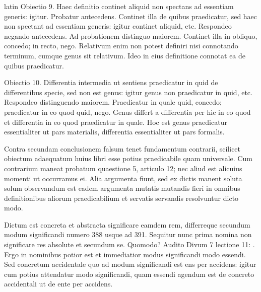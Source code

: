 \begin{otherlanguage*}{latin}
\pstart
Obiectio 9. Haec definitio continet aliquid non spectans ad essentiam generis:
igitur. Probatur antecedens. Continet illa de quibus praedicatur, sed haec non spectant ad essentiam generis:
igitur continet aliquid, etc. Respondeo negando antecedens. Ad probationem distinguo maiorem. Continet illa in obliquo, concedo; in recto, nego. Relativum enim non potest definiri nisi connotando terminum, cumque genus sit relativum. Ideo in eius definitione connotat ea de quibus praedicatur. 
\pend

\pstart
Obiectio 10. Differentia intermedia ut sentiens praedicatur in quid de differentibus specie, sed non est genus:
igitur genus non praedicatur in quid, etc. Respondeo distinguendo maiorem. Praedicatur in quale quid, concedo; praedicatur in eo quod quid, nego. Genus differt a differentia per hic in eo quod et differentia in eo quod praedicatur in quale. Hoc est genus praedicatur essentialiter ut pars materialis, differentia essentialiter ut pars formalis. 
\pend

\pstart
Contra secundam conclusionem falsum tenet fundamentum contrarii, scilicet obiectum adaequatum huius libri esse potius praedicabile quam universale. Cum contrarium maneat probatum quaestione 5, articulo 12; nec aliud est alicuius momenti ut occurramus ei. Alia argumenta fiunt, sed ex dictis manent soluta solum observandum est eadem argumenta mutatis mutandis fieri in omnibus definitionibus aliorum praedicabilium et servatis servandis resolvuntur dicto modo. 
\pend

\pstart
{}
\pend

\pstart
Dictum est concreta et abstracta significare eamdem rem, differreque secundum modum significandi numero 388 usque ad 391. Sequitur nunc prima nomina non significare res absolute et secundum se. Quomodo? Audito Divum  7  lectione 11:
. Ergo in nominibus potior est et immediatior modus significandi modo essendi. Sed concretum accidentale quo ad modum significandi est ens per accidens:
igitur cum potius attendatur modo significandi, quam essendi agendum est de concreto accidentali ut de ente per accidens. 
\pend


\end{otherlanguage*}
